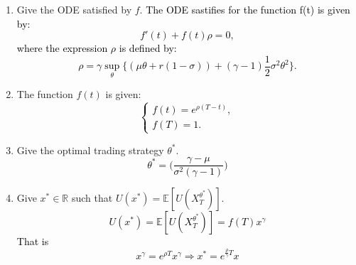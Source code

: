 \documentclass[11pt,a4paper]{article}
\theoremstyle{plain}
\theoremstyle{definition}
\newcommand{\E}{\mathbb{E}}        %
\begin{document}
\begin{enumerate}[label=Q\arabic*., start=1]
{\begin{equation*}
\begin{cases}
                    -\partial_t v(t,x) - \sup_\theta \bigg\{\partial_x v(t,x) (\mu \theta + r(1-\theta))x + \partial_{xx}v(t,x)\frac{1}{2}\sigma^2 \theta^2 x^2\bigg\} = 0,\\
                    V(T,x)=x^\gamma. 
        \end{cases}
        \end{equation*}
    }
    \item Give the ODE satisfied by $f$.
    \textcolor{black}{The ODE sastifies for the function f(t) is given by:
    \begin{equation*}
        f'(t) + f(t)\rho =0, 
    \end{equation*}
    where the expression $\rho$ is defined by:
    \begin{equation*}
        \rho = \gamma \sup_\theta \bigg\{  (\mu \theta + r(1-\sigma)) + (\gamma-1) \frac{1}{2} \sigma^2 \theta^2 \bigg\}.
    \end{equation*}}
    \item The function $f(t)$ is given:
    \textcolor{black}{
    \begin{equation*}
        \begin{cases}
            f(t)= e^{\rho(T-t)},\\
            f(T)= 1.
        \end{cases}
    \end{equation*}
    }
    \item Give the optimal trading strategy $\theta^*$.
    \textcolor{black}{
    \begin{equation*}
                \theta^* = \Bigg( \frac{\gamma-\mu}{\sigma^2(\gamma-1)}\Bigg)
    \end{equation*}}
    \item Give $x^* \in \mathbb{R}$ such that $U(x^*) = \mathbb{E}[U(X_T^{\theta^*})]$.
    \textcolor{black}{ 
    \begin{equation*}
        U(x^*) = \mathbb{E}[U(X_T^{\theta^*})] = f(T)x^\gamma
    \end{equation*}
    That is 
    \begin{equation*}
        x^\gamma = e^{\rho T} x^\gamma \Rightarrow x^* = e^{\frac{\rho}{\gamma} T}x
    \end{equation*}}
\end{enumerate}


\end{document}
